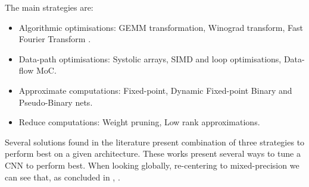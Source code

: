 
The main strategies are:
\begin{itemize}
	\item Algorithmic optimisations: GEMM transformation, Winograd transform, Fast Fourier Transform .
	\item Data-path optimisations: Systolic arrays, SIMD and loop optimisations, Data-flow MoC.
	\item Approximate computations: Fixed-point, Dynamic Fixed-point Binary and Pseudo-Binary nets.
	\item Reduce computations: Weight pruning, Low rank approximations.
\end{itemize}

Several solutions found in the literature present combination of three strategies to perform best on a given architecture. These works present several ways to tune a CNN to perform best. When looking globally, re-centering to mixed-precision we can see that, as concluded in \cite{Abdelouahab2018}, .
